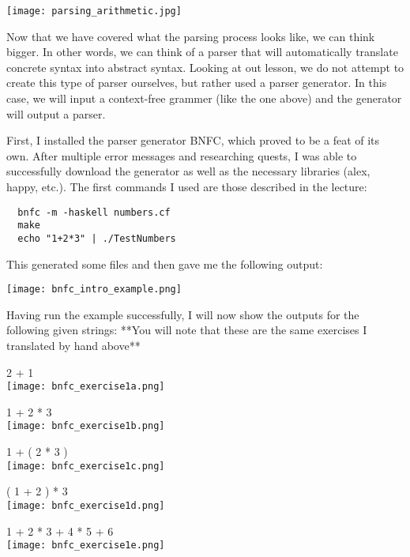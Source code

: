 \documentclass{article}
\theoremstyle{theorem}
\theoremstyle{definition}
\theoremstyle{remark}
\begin{document}
\begin{center}
  \texttt{[image: parsing\_arithmetic.jpg]}
\end{center}


Now that we have covered what the parsing process looks like, we can think bigger. In other words, we can think of a parser that will automatically translate concrete syntax into abstract syntax. Looking at out lesson, we do not attempt to create this type of parser ourselves, but rather 
used a parser generator. In this case, we will input a context-free grammer (like the one above) and the generator will output a parser.

First, I installed the parser generator BNFC, which proved to be a feat of its own. After multiple error messages and researching quests, I was able to successfully download the generator as well as the necessary libraries (alex, happy, etc.). The first commands I used are those described in the 
lecture: 
\begin{verbatim}
  bnfc -m -haskell numbers.cf
  make
  echo "1+2*3" | ./TestNumbers
\end{verbatim}
This generated some files and then gave me the following output: 
\begin{center}
  \texttt{[image: bnfc\_intro\_example.png]}
\end{center}

Having run the example successfully, I will now show the outputs for the following given strings: **You will note that these are the same exercises I translated by hand above**
\begin{center}
  2 + 1 \\
  \texttt{[image: bnfc\_exercise1a.png]}

  1 + 2 * 3\\
  \texttt{[image: bnfc\_exercise1b.png]}

  1 + ( 2 * 3 )\\
  \texttt{[image: bnfc\_exercise1c.png]}

  ( 1 + 2 ) * 3\\
  \texttt{[image: bnfc\_exercise1d.png]}

  1 + 2 * 3 + 4 * 5 + 6\\
  \texttt{[image: bnfc\_exercise1e.png]}
\end{center}
\end{document}
